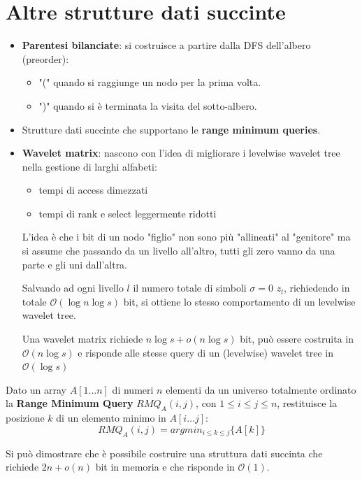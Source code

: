 \section{Altre strutture dati succinte}
\begin{itemize}
    \item \textbf{Parentesi bilanciate}: si costruisce a partire dalla DFS
          dell'albero (preorder):
          \begin{itemize}
              \item "(" quando si raggiunge un nodo per la prima volta.
              \item ")" quando si è terminata la visita del sotto-albero.
          \end{itemize}
    \item Strutture dati succinte che supportano le \textbf{range minimum queries}.
    \item \textbf{Wavelet matrix}: nascono con l'idea di migliorare i levelwise
          wavelet tree nella gestione di larghi alfabeti:
          \begin{itemize}
              \item tempi di access dimezzati
              \item tempi di rank e select leggermente ridotti
          \end{itemize}

          L'idea è che i bit di un nodo "figlio" non sono più "allineati" al
          "genitore" ma si assume che passando da un livello all'altro, tutti gli
          zero vanno da una parte e gli uni dall'altra.

          Salvando ad ogni livello $l$ il numero totale di simboli $\sigma = 0$
          $z_l$, richiedendo in totale $\mathcal{O}(\log n \log s)$ bit, si ottiene
          lo stesso comportamento di un levelwise wavelet tree.

          Una wavelet matrix richiede $n \log s + o(n \log s)$ bit, può essere
          costruita in $\mathcal{O}(n \log s)$ e risponde alle stesse query di un
          (levelwise) wavelet tree in $\mathcal{O}(\log s)$
\end{itemize}
\begin{definizione}
    Dato un array $A[1\dots n]$ di numeri $n$ elementi da un universo totalmente
    ordinato la \textbf{Range Minimum Query} $RMQ_A(i, j)$, con $1 \leq i \leq
        j \leq n$, restituisce la posizione $k$ di un elemento minimo in $A[i
                \dots j]$:$$RMQ_A(i, j) = argmin_{i \leq k \leq j}\{A[k]\}$$

    Si può dimostrare che è possibile costruire una struttura dati succinta che
    richiede $2n + o(n)$ bit in memoria e che risponde in $\mathcal{O}(1)$.
\end{definizione}
